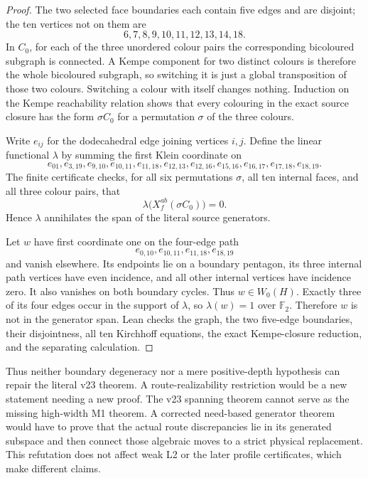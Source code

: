 \begin{proof}
The two selected face boundaries each contain five edges and are disjoint;
the ten vertices not on them are
\[
               6,7,8,9,10,11,12,13,14,18.
\]
In $C_0$, for each of the three unordered colour pairs the corresponding
bicoloured subgraph is connected.  A Kempe component for two distinct colours
is therefore the whole bicoloured subgraph, so switching it is just a global
transposition of those two colours.  Switching a colour with itself changes
nothing.  Induction on the Kempe reachability relation shows that every
colouring in the exact source closure has the form $\sigma C_0$ for a
permutation $\sigma$ of the three colours.

Write $e_{ij}$ for the dodecahedral edge joining vertices $i,j$.  Define the
linear functional $\lambda$ by summing the first Klein coordinate on
\[
 e_{01},e_{3,19},e_{9,10},e_{10,11},e_{11,18},e_{12,13},e_{12,16},
 e_{15,16},e_{16,17},e_{17,18},e_{18,19}.
\]
The finite certificate checks, for all six permutations $\sigma$, all ten
internal faces, and all three colour pairs, that
\[
                    \lambda\bigl(X_f^{ab}(\sigma C_0)\bigr)=0.
\]
Hence $\lambda$ annihilates the span of the literal source generators.

Let $w$ have first coordinate one on the four-edge path
\[
                  e_{0,10},e_{10,11},e_{11,18},e_{18,19}
\]
and vanish elsewhere.  Its endpoints lie on a boundary pentagon, its three
internal path vertices have even incidence, and all other internal vertices
have incidence zero.  It also vanishes on both boundary cycles.  Thus
$w\in W_0(H)$.  Exactly three of its four edges occur in the support of
$\lambda$, so $\lambda(w)=1$ over $\mathbb F_2$.  Therefore $w$ is not in the
generator span.  Lean checks the graph, the two five-edge boundaries, their
disjointness, all ten Kirchhoff equations, the exact Kempe-closure reduction,
and the separating calculation.
\end{proof}

Thus neither boundary degeneracy nor a mere positive-depth hypothesis can
repair the literal v23 theorem.  A route-realizability restriction would be a
new statement needing a new proof.  The v23 spanning theorem cannot serve as
the missing high-width M1 theorem.  A corrected need-based generator theorem
would have to prove that the actual route discrepancies lie in its generated
subspace and then connect those algebraic moves to a strict physical
replacement.  This refutation does not affect weak L2 or the later profile
certificates, which make different claims.

